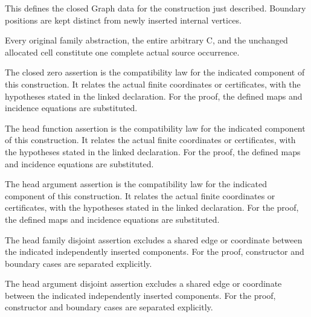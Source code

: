 This defines the closed Graph data for the construction just described. Boundary positions are kept distinct from newly inserted internal vertices.
\par{}

Every original family abstraction, the entire arbitrary C, and the unchanged allocated cell constitute one complete actual source occurrence.
\par{}

The closed zero assertion is the compatibility law for the indicated component of this construction. It relates the actual finite coordinates or certificates, with the hypotheses stated in the linked declaration.
For the proof, the defined maps and incidence equations are substituted.
\par{}

The head function assertion is the compatibility law for the indicated component of this construction. It relates the actual finite coordinates or certificates, with the hypotheses stated in the linked declaration.
For the proof, the defined maps and incidence equations are substituted.
\par{}

The head argument assertion is the compatibility law for the indicated component of this construction. It relates the actual finite coordinates or certificates, with the hypotheses stated in the linked declaration.
For the proof, the defined maps and incidence equations are substituted.
\par{}

The head family disjoint assertion excludes a shared edge or coordinate between the indicated independently inserted components.
For the proof, constructor and boundary cases are separated explicitly.
\par{}

The head argument disjoint assertion excludes a shared edge or coordinate between the indicated independently inserted components.
For the proof, constructor and boundary cases are separated explicitly.
\par{}

